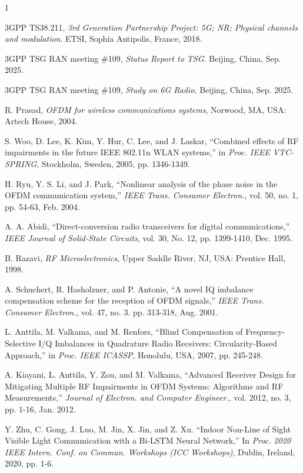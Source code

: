 \documentclass[lettersize,journal]{IEEEtran}
\begin{document}
\begin{thebibliography}{1}


3GPP TS38.211, {\it{3rd Generation Partnership Project: 5G; NR; Physical channels and modulation}}. ETSI, Sophia Antipolis, France, 2018.

3GPP TSG RAN meeting \#109, {\it{Status Report to TSG}}. Beijing, China, Sep. 2025.

3GPP TSG RAN meeting \#109, {\it{Study on 6G Radio}}. Beijing, China, Sep. 2025.

R. Prasad, {\it{OFDM for wireless communications systems}}, Norwood, MA, USA: Artech House, 2004.

S. Woo, D. Lee, K. Kim, Y. Hur, C. Lee, and J. Laskar, ``Combined effects of RF impairments in the future IEEE 802.11n WLAN systems,'' in \textit{Proc. IEEE VTC-SPRING}, Stockholm, Sweden, 2005, pp. 1346-1349.

H. Ryu, Y. S. Li, and J. Park, ``Nonlinear analysis of the phase noise in the OFDM communication system,'' \textit{IEEE Trans. Consumer Electron.}, vol. 50, no. 1, pp. 54-63, Feb. 2004.

A. A. Abidi, ``Direct-conversion radio transceivers for digital communications,'' \textit{IEEE Journal of Solid-State Circuits}, vol. 30, No. 12, pp. 1399-1410, Dec. 1995.

B. Razavi, {\it{RF Microelectronics}}, Upper Saddle River, NJ, USA: Prentice Hall, 1998.

A. Schuchert, R. Hasholzner, and P. Antonie, ``A novel IQ imbalance compensation scheme for the reception of OFDM signals,'' \textit{IEEE Trans. Consumer Electron.}, vol. 47, no. 3. pp. 313-318, Aug. 2001.

L. Anttila, M. Valkama, and M. Renfors, ``Blind Compensation of Frequency-Selective I/Q Imbalances in Quadrature Radio Receivers: Circularity-Based Approach,'' in \textit{Proc. IEEE ICASSP}, Honolulu, USA, 2007, pp. 245-248.

A. Kiayani, L. Anttila, Y. Zou, and M. Valkama, ``Advanced Receiver Design for Mitigating Multiple RF Impairments in OFDM Systems: Algorithms and RF Measurements,'' \textit{Journal of Electron. and Computer Engineer.}, vol. 2012, no. 3, pp. 1-16, Jan. 2012.

Y. Zhu, C. Gong, J. Luo, M. Jin, X. Jin, and Z. Xu. ``Indoor Non-Line of Sight Visible Light Communication with a Bi-LSTM Neural Network,'' In \textit{Proc. 2020 IEEE Intern. Conf. on Commun. Workshops (ICC Workshops)}, Dublin, Ireland, 2020, pp. 1-6.


\end{thebibliography}
\end{document}
